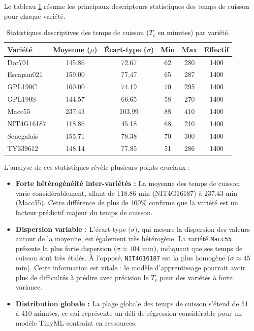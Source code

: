   Le tableau \ref{tab:stats_descriptives} résume les principaux descripteurs statistiques des temps de cuisson pour chaque variété.

  \begin{table}[h!]
  \centering
  \caption{Statistiques descriptives des temps de cuisson ($T_c$ en minutes) par variété.}
  \label{tab:stats_descriptives}
  \begin{tabular}{lccccc}
  \toprule
  \textbf{Variété} & \textbf{Moyenne ($\mu$)} & \textbf{Écart-type ($\sigma$)} & \textbf{Min} & \textbf{Max} & \textbf{Effectif} \\ \midrule
  Dor701       & 145.86 & 72.67 & 62 & 280 & 1400 \\
  Escapan021   & 159.00 & 77.47 & 65 & 287 & 1400 \\
  GPL190C      & 160.00 & 74.19 & 70 & 295 & 1400 \\
  GPL190S      & 144.57 & 66.65 & 58 & 270 & 1400 \\
  Macc55       & 237.43 & 103.99 & 88 & 410 & 1400 \\
  NIT4G16187   & 118.86 & 45.18 & 68 & 210 & 1400 \\
  Senegalais   & 155.71 & 78.38 & 70 & 300 & 1400 \\
  TY339612     & 148.14 & 77.85 & 51 & 286 & 1400 \\ \bottomrule
  \end{tabular}
  \end{table}

  L'analyse de ces statistiques révèle plusieurs points cruciaux :
  \begin{itemize}
      \item \textbf{Forte hétérogénéité inter-variétés :} La moyenne des temps de cuisson varie considérablement, allant de $118.86$ min (NIT4G16187) à $237.43$ min (Macc55). Cette différence de plus de 100\% confirme que la variété est un facteur prédictif majeur du temps de cuisson.
      \item \textbf{Dispersion variable :} L'écart-type ($\sigma$), qui mesure la dispersion des valeurs autour de la moyenne, est également très hétérogène. La variété \texttt{Macc55} présente la plus forte dispersion ($\sigma \approx 104$ min), indiquant que ses temps de cuisson sont très étalés. À l'opposé, \texttt{NIT4G16187} est la plus homogène ($\sigma \approx 45$ min). Cette information est vitale : le modèle d'apprentissage pourrait avoir plus de difficultés à prédire avec précision le $T_c$ pour des variétés à forte variance.
      \item \textbf{Distribution globale :} La plage globale des temps de cuisson s'étend de 51 à 410 minutes, ce qui représente un défi de régression considérable pour un modèle TinyML contraint en ressources.
  \end{itemize}

